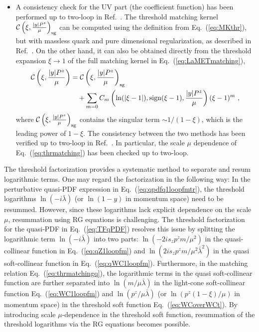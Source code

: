 \documentclass[a4paper,11pt]{article}
\begin{document}
\begin{itemize}
    \item A consistency check for the UV part (the coefficient function) has been performed up to two-loop in Ref.~\cite{Ji:2023pba}. The threshold matching kernel $\mathcal{C}\left(\xi,\frac{|y| P^z}{\mu}\right)_{\rm sg}$ can be computed using the definition from Eq.~(\ref{eq:MKthr}), but with massless quark and pure dimensional regularization, as described in Ref.~\cite{Ji:2023pba}. On the other hand, it can also be obtained directly from the threshold expansion $\xi \rightarrow 1$ of the full matching kernel in Eq.~(\ref{eq:LaMETmatching}),
    \begin{align}\label{eq:threxp}
    {\cal C}\left(\xi,\frac{|y| P^z}{\mu}\right) &= {\cal C}\left(\xi,\frac{|y| P^z}{\mu}\right)_{\rm sg} \nonumber\\
    &\quad + \sum_{m=0} C_{m}\left(\ln(|\xi-1|),{\rm sign}(\xi-1),\frac{|y| P^z}{\mu}\right) (\xi-1)^{m} \ ,
    \end{align}
    where ${\cal C}\left(\xi,\frac{|y| P^z}{\mu}\right)_{\rm sg}$ contains the singular term $\sim 1/(1-\xi)$, which is the leading power of $1-\xi$.
    The consistency between the two methods has been verified up to two-loop in Ref.~\cite{Ji:2023pba}. In particular, the scale $\mu$ dependence of Eq.~(\ref{eq:thrmatching}) has been checked up to two-loop.
    
\end{itemize}

The threshold factorization provides a systematic method to separate and resum logarithmic terms. One may regard the factorization in the following way: In the perturbative quasi-PDF expression in Eq.~(\ref{eq:qpdfq1loopfmtr}), the threshold logarithms $\ln(-i \bar{\lambda})$ (or $\ln(1-y)$ in momentum space) need to be resummed. However, since these logarithms lack explicit dependence on the scale $\mu$, resummation using RG equations is challenging.
The threshold factorization for the quasi-PDF in Eq.~(\ref{eq:TFqPDF}) resolves this issue by splitting the logarithmic term $\ln(-i \bar{\lambda})$ into two parts: $ \ln\left(-2 i s_z p^z m/\mu^2\right) $ in the quasi-collinear function in Eq.~(\ref{eq:qZ1loopfm}) and $\ln\left(2 i s_z p^z m/\mu^2 \bar{\lambda}^2\right)$ in the quasi soft-collinear function in Eq.~(\ref{eq:qWC1loopfm}). Furthermore, in the matching relation Eq.~(\ref{eq:thrmatchingq}), the logarithmic terms in the quasi soft-collinear function are further separated into $\ln(m/\mu \bar{\lambda})$ in the light-cone soft-collinear function Eq.~(\ref{eq:WC1loopfm}) and $\ln(p^z/\mu \bar{\lambda})$ (or $\ln(p^z(1-\xi)/\mu)$ in momentum space) in the threshold soft function Eq.~(\ref{eq:WCoverWCt}). By introducing scale $\mu$-dependence in the threshold soft function, resummation of the threshold logarithms via the RG equations becomes possible.
\end{document}
